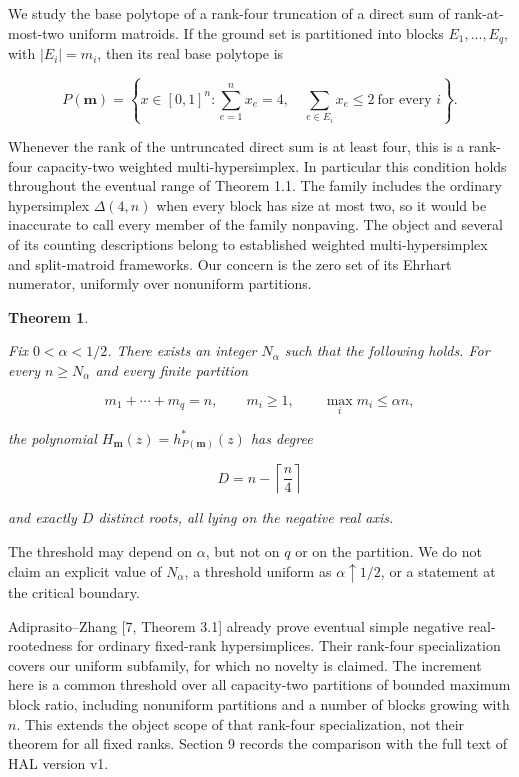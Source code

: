 \documentclass[11pt]{article}
\newtheorem{theorem}{Theorem}[section]
\begin{document}
We study the base polytope of a rank-four truncation of a direct sum of
rank-at-most-two uniform matroids.  If the ground set is partitioned into blocks
$E_1,\ldots,E_q$, with $|E_i|=m_i$, then its real base polytope is

\[
P(\mathbf m)=\left\{x\in[0,1]^n:
  \sum_{e=1}^n x_e=4,\quad
  \sum_{e\in E_i}x_e\le2\ \text{for every }i
\right\}. \tag{1.1}
\]

Whenever the rank of the untruncated direct sum is at least four, this is a
rank-four capacity-two weighted multi-hypersimplex.  In particular this condition
holds throughout the eventual range of Theorem 1.1.  The family includes the
ordinary hypersimplex $\Delta(4,n)$ when every block has size at most two, so it
would be inaccurate to call every member of the family nonpaving.  The object and
several of its counting descriptions belong to established weighted
multi-hypersimplex and split-matroid frameworks.  Our concern is the zero set of
its Ehrhart numerator, uniformly over nonuniform partitions.

\Needspace{0.16\textheight}
\begin{theorem}
\label{theorem:1-1}

Fix $0<\alpha<1/2$.  There exists an integer $N_\alpha$ such that the
following holds.  For every $n\ge N_\alpha$ and every finite partition

\[
  m_1+\cdots+m_q=n,\qquad m_i\ge1,\qquad \max_i m_i\le\alpha n,
\]

the polynomial $H_{\mathbf m}(z)=h^*_{P(\mathbf m)}(z)$ has degree

\[
  D=n-\left\lceil\frac n4\right\rceil
\]

and exactly $D$ distinct roots, all lying on the negative real axis.
\end{theorem}


The threshold may depend on $\alpha$, but not on $q$ or on the partition.
We do not claim an explicit value of $N_\alpha$, a threshold uniform as
$\alpha\uparrow1/2$, or a statement at the critical boundary.

Adiprasito--Zhang [7, Theorem 3.1] already prove eventual simple negative
real-rootedness for ordinary fixed-rank hypersimplices.  Their rank-four
specialization covers our uniform subfamily, for which no novelty is claimed.
The increment here is a common threshold over all capacity-two partitions of
bounded maximum block ratio, including nonuniform partitions and a number of
blocks growing with $n$.  This extends the object scope of that rank-four
specialization, not their theorem for all fixed ranks.  Section 9 records the
comparison with the full text of HAL version v1.
\end{document}
